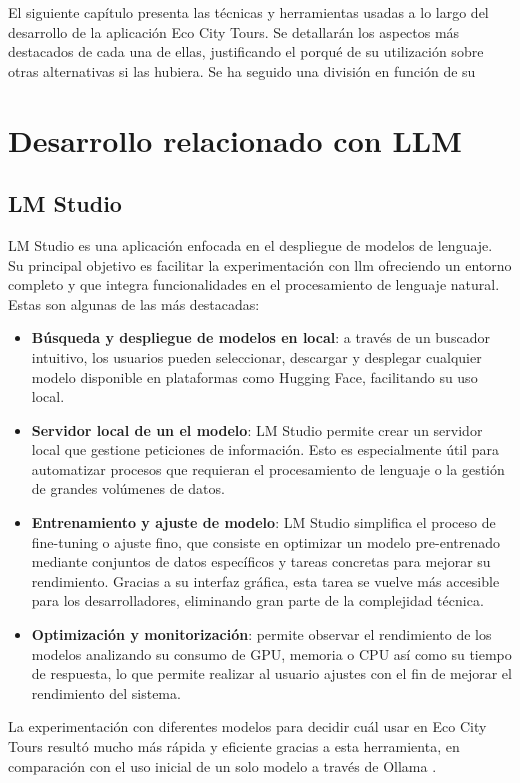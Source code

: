 
El siguiente capítulo presenta las técnicas y herramientas usadas a lo largo del desarrollo de la aplicación Eco City Tours. Se detallarán los aspectos más destacados de cada una de ellas, justificando el porqué de su utilización sobre otras alternativas si las hubiera. Se ha seguido una división en función de su 


\section{Desarrollo relacionado con LLM}
	\subsection{LM Studio}
	LM Studio \cite{lmstudio_ai} es una aplicación enfocada en el despliegue de modelos de lenguaje. Su principal objetivo es facilitar la experimentación con \acrlong{llm} ofreciendo un entorno completo y que integra funcionalidades en el procesamiento de lenguaje natural.
	Estas son algunas de las más destacadas:
	
	
	\begin{itemize}
		
		\item \textbf{Búsqueda y despliegue de modelos en local}: a través de un buscador intuitivo, los usuarios pueden seleccionar, descargar y desplegar cualquier modelo disponible en plataformas como Hugging Face, facilitando su uso local.
		
		\item \textbf{Servidor local de un el modelo}: LM Studio permite crear un servidor local que gestione peticiones de información. Esto es especialmente útil para automatizar procesos que requieran el procesamiento de lenguaje o la gestión de grandes volúmenes de datos.
		
		\item \textbf{Entrenamiento y ajuste de modelo}: LM Studio simplifica el proceso de fine-tuning o ajuste fino, que consiste en optimizar un modelo pre-entrenado mediante conjuntos de datos específicos y tareas concretas para mejorar su rendimiento. Gracias a su interfaz gráfica, esta tarea se vuelve más accesible para los desarrolladores, eliminando gran parte de la complejidad técnica.
		
		\item \textbf{Optimización y monitorización}: permite observar el rendimiento de los modelos analizando su consumo de GPU, memoria o CPU así como su tiempo de respuesta, lo que permite realizar al usuario ajustes con el fin de mejorar el rendimiento del sistema.
	\end{itemize}
	La experimentación con diferentes modelos para decidir cuál usar en Eco City Tours resultó mucho más rápida y eficiente gracias a esta herramienta, en comparación con el uso inicial de un solo modelo a través de Ollama \cite{ollama}.
	

